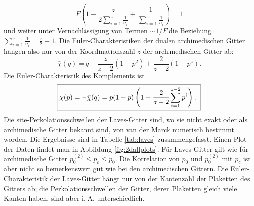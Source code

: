 \begin{equation}
  F\left(1-\frac{z}{2 \sum_{i=1}^z \frac{1}{n_i}}+\frac{1}{\sum_{i=1}^z \frac{1}{n_i}}\right)=1
\end{equation}
und weiter unter Vernachl\"assigung von Termen $\sim 1/F$ die Beziehung $\sum_{i=1}^z \frac{1}{n_i}=\frac{z}{2}-1$. Die Euler-Charakteristiken der dualen archimedischen Gitter h\"angen also nur von der Koordinationszahl $z$ der archimedischen Gitter ab:
\begin{equation}
 \bar{\chi}(q) =q-\frac{z}{z-2}(1-p^2)+\frac{2}{z-2}(1-p^z).
\end{equation}
Die Euler-Charakteristik des Komplements ist  
\begin{equation}
\fbox{$ \displaystyle
   \chi(p) =-\bar{\chi}(q)=p(1-p)\left( 1-\frac{2}{z-2}\sum_{i=1}^{z-2}p^{i}\right).$
}
\end{equation}
Die site-Perkolationsschwellen der Laves-Gitter sind, wo sie nicht exakt oder als archimedische Gitter bekannt sind, von van der Marck \cite{Marck:03} numerisch bestimmt worden. Die Ergebnisse sind in Tabelle \ref{tab:laves} zusammengefasst. Einen Plot der Daten findet man in Abbildung \ref{fig:2dallplots}. F\"ur Laves-Gitter gilt wie f\"ur archimedische Gitter $p_0^{(2)}\leq p_c \leq p_0$. Die Korrelation von $p_0$ und $p_0^{(2)}$ mit $p_c$ ist aber nicht so bemerkenswert gut wie bei den archimedischen Gittern. Die Euler-Charakteristik der Laves-Gitter h\"angt nur von der Kantenzahl der Plaketten des Gitters ab; die Perkolationsschwellen der Gitter, deren Plaketten gleich viele Kanten haben, sind aber i. A. unterschiedlich.

